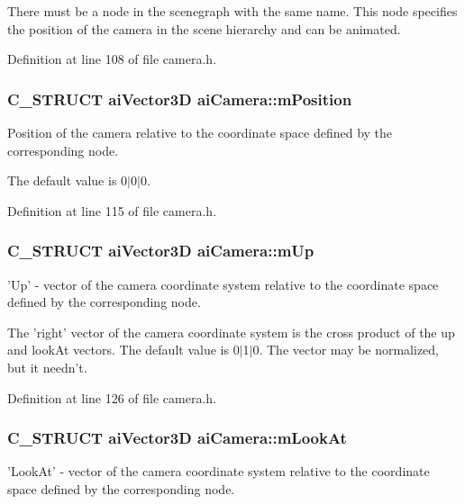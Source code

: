 There must be a node in the scenegraph with the same name. This node specifies the position of the camera in the scene hierarchy and can be animated. 

Definition at line 108 of file camera.h.\hypertarget{structai_camera_518617ea192ca0698e748a4399e7c3a5}{
\subsubsection[mPosition]{\setlength{\rightskip}{0pt plus 5cm}C\_\-STRUCT aiVector3D {\bf aiCamera::mPosition}}}
\label{structai_camera_518617ea192ca0698e748a4399e7c3a5}


Position of the camera relative to the coordinate space defined by the corresponding node.

The default value is 0$|$0$|$0. 

Definition at line 115 of file camera.h.\hypertarget{structai_camera_7fb42b287389b4f99c883098268d6d1a}{
\subsubsection[mUp]{\setlength{\rightskip}{0pt plus 5cm}C\_\-STRUCT aiVector3D {\bf aiCamera::mUp}}}
\label{structai_camera_7fb42b287389b4f99c883098268d6d1a}


'Up' - vector of the camera coordinate system relative to the coordinate space defined by the corresponding node.

The 'right' vector of the camera coordinate system is the cross product of the up and lookAt vectors. The default value is 0$|$1$|$0. The vector may be normalized, but it needn't. 

Definition at line 126 of file camera.h.\hypertarget{structai_camera_f9463249ac870e030fa435b1186cef23}{
\subsubsection[mLookAt]{\setlength{\rightskip}{0pt plus 5cm}C\_\-STRUCT aiVector3D {\bf aiCamera::mLookAt}}}
\label{structai_camera_f9463249ac870e030fa435b1186cef23}


'LookAt' - vector of the camera coordinate system relative to the coordinate space defined by the corresponding node.

